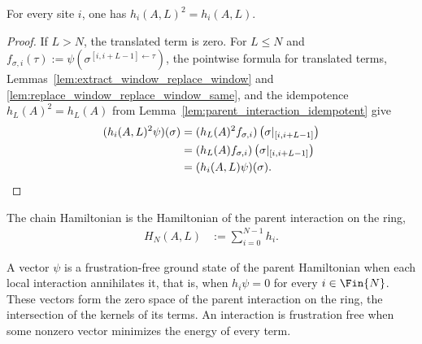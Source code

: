 \begin{lemma}\label{lem:local_term_idempotent}
    \leanok
    For every site $i$, one has $h_i(A,L)^2=h_i(A,L)$.
\end{lemma}

\begin{proof}
    \leanok
    If $L>N$, the translated term is zero. For $L\le N$ and
    $f_{\sigma,i}(\tau)
        :=\psi(\sigma^{[i,i+L-1]\leftarrow\tau})$,
    the pointwise formula for translated terms,
    Lemmas~\ref{lem:extract_window_replace_window} and
    \ref{lem:replace_window_replace_window_same}, and the idempotence
    $h_L(A)^2=h_L(A)$ from Lemma~\ref{lem:parent_interaction_idempotent} give
    \begin{align}
        (h_i(A,L)^2\psi)(\sigma)
         & =
        (h_L(A)^2f_{\sigma,i})
        \left(\sigma|_{[i,i+L-1]}\right) \notag \\
         & =
        (h_L(A)f_{\sigma,i})
        \left(\sigma|_{[i,i+L-1]}\right) \notag \\
         & =
        (h_i(A,L)\psi)(\sigma).
        \notag
    \end{align}
\end{proof}

\begin{definition}\label{def:parent_hamiltonian}
    \leanok
    The chain Hamiltonian is the Hamiltonian of the parent interaction on the
    ring,
    \begin{align}
        H_N(A,L)
         & :=\sum_{i=0}^{N-1}h_i.
        \label{eq:parent_hamiltonian}
    \end{align}
\end{definition}

\begin{definition}\label{def:is_frustration_free}
    A vector $\psi$ is a frustration-free ground state of the parent Hamiltonian
    when each local interaction annihilates it, that is, when
    $h_i\psi=0$ for every $i\in\Fin{N}$. These vectors form the zero space of
    the parent interaction on the ring, the intersection of the kernels of its
    terms. An interaction is frustration free when some nonzero vector
    minimizes the energy of every term.
\end{definition}

